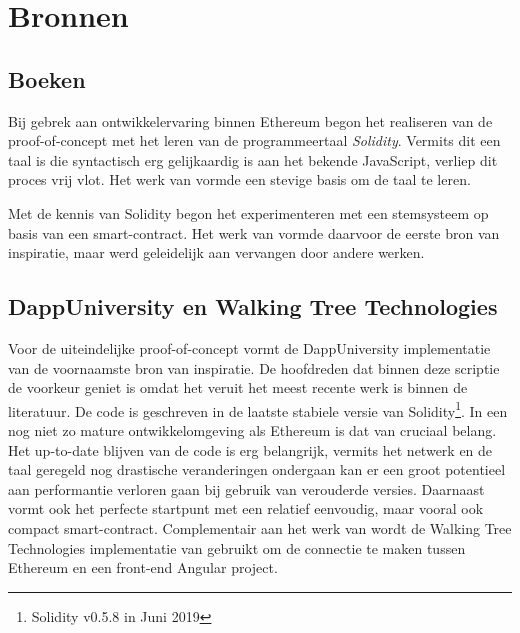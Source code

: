 \section{Bronnen}
	\subsection{Boeken}
	Bij gebrek aan ontwikkelervaring binnen Ethereum begon het realiseren van de proof-of-concept met het leren van de programmeertaal \textit{Solidity}. Vermits dit een taal is die syntactisch erg gelijkaardig is aan het bekende JavaScript, verliep dit proces vrij vlot. Het werk van \textcite{Antonopoulos2018} vormde een stevige basis om de taal te leren.
	
	Met de kennis van Solidity begon het experimenteren met een stemsysteem op basis van een smart-contract. Het werk van \textcite{Mukhopadhyay2018} vormde daarvoor de eerste bron van inspiratie, maar werd geleidelijk aan vervangen door andere werken.
	
	\subsection{DappUniversity en Walking Tree Technologies}
	Voor de uiteindelijke proof-of-concept vormt de DappUniversity implementatie van \textcite{McCubin2019}  de voornaamste bron van inspiratie. De hoofdreden dat \textcite{McCubin2019} binnen deze scriptie de voorkeur geniet is omdat  het veruit het meest recente werk is binnen de literatuur. De code is geschreven in de laatste stabiele versie van Solidity\footnote{Solidity v0.5.8 in Juni 2019}. In een nog niet zo mature ontwikkelomgeving als Ethereum is dat van cruciaal belang. Het up-to-date blijven van de code is erg belangrijk, vermits het netwerk  en de taal geregeld nog drastische veranderingen ondergaan kan er een groot potentieel aan performantie verloren gaan bij  gebruik van verouderde versies. Daarnaast vormt \textcite{McCubin2019} ook het perfecte startpunt met een relatief eenvoudig, maar vooral ook compact smart-contract. Complementair aan het werk van \textcite{McCubin2019} wordt de Walking Tree Technologies implementatie van \textcite{Ranjan2018} gebruikt om de connectie te maken tussen Ethereum en een front-end Angular project.
	
